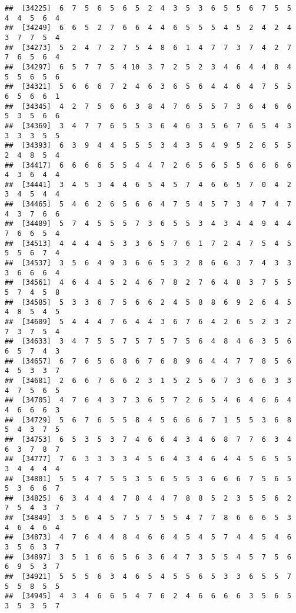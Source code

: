 \documentclass[
]{book}
\begin{document}
\begin{verbatim}
##  [34225]  6  7  5  6  5  6  5  2  4  3  5  3  6  5  5  6  7  5  5  4  4  5  6  4
##  [34249]  6  6  5  2  7  6  6  4  4  6  5  5  5  4  5  2  4  2  4  3  7  7  5  4
##  [34273]  5  2  4  7  2  7  5  4  8  6  1  4  7  7  3  7  4  2  7  7  6  5  6  4
##  [34297]  6  5  7  7  5  4 10  3  7  2  5  2  3  4  6  4  4  8  4  5  5  6  5  6
##  [34321]  5  6  6  6  7  2  4  6  3  6  5  6  4  4  6  4  7  5  5  6  5  6  6  1
##  [34345]  4  2  7  5  6  6  3  8  4  7  6  5  5  7  3  6  4  6  6  5  3  5  6  6
##  [34369]  3  4  7  7  6  5  5  3  6  4  6  3  5  6  7  6  5  4  3  3  3  3  5  5
##  [34393]  6  3  9  4  4  5  5  5  3  4  3  5  4  9  5  2  6  5  5  2  4  8  5  4
##  [34417]  6  6  6  6  5  5  4  4  7  2  6  5  6  5  5  6  6  6  6  4  3  6  4  4
##  [34441]  3  4  5  3  4  4  6  5  4  5  7  4  6  6  5  7  0  4  2  3  4  5  4  4
##  [34465]  5  4  6  2  6  5  6  6  4  7  5  4  5  7  3  4  7  4  7  4  3  7  6  6
##  [34489]  5  7  4  5  5  5  7  3  6  5  5  3  4  3  4  4  9  4  4  7  6  6  5  4
##  [34513]  4  4  4  4  5  3  3  6  5  7  6  1  7  2  4  7  5  4  5  5  5  6  7  4
##  [34537]  3  5  6  4  9  3  6  6  5  3  2  8  6  6  3  7  4  3  3  3  6  6  6  4
##  [34561]  4  6  4  4  5  2  4  6  7  8  2  7  6  4  8  3  7  5  5  5  7  4  5  8
##  [34585]  5  3  3  6  7  5  6  6  2  4  5  8  8  6  9  2  6  4  5  4  8  5  4  5
##  [34609]  5  4  4  4  7  6  4  4  3  6  7  6  4  2  6  5  2  3  2  7  3  7  5  4
##  [34633]  3  4  7  5  5  7  5  7  5  7  5  6  4  8  4  6  3  5  6  6  5  7  4  3
##  [34657]  6  7  6  5  6  8  6  7  6  8  9  6  4  4  7  7  8  5  6  4  5  3  3  7
##  [34681]  2  6  6  7  6  6  2  3  1  5  2  5  6  7  3  6  6  3  3  4  7  5  6  5
##  [34705]  4  7  6  4  3  7  3  6  5  7  2  6  5  4  6  4  6  6  4  4  6  6  6  3
##  [34729]  5  6  7  6  5  5  8  4  5  6  6  6  7  1  5  5  3  6  8  5  4  3  7  5
##  [34753]  6  5  3  5  3  7  4  6  6  4  3  4  6  8  7  7  6  3  4  6  3  7  8  7
##  [34777]  7  6  3  3  3  3  4  5  6  4  3  4  6  4  4  5  6  5  5  3  4  4  4  4
##  [34801]  5  5  4  7  5  5  3  5  6  5  5  3  6  6  6  7  5  6  5  5  3  6  6  7
##  [34825]  6  3  4  4  4  7  8  4  4  7  8  8  5  2  3  5  5  6  2  7  5  4  3  7
##  [34849]  3  5  6  4  5  7  5  7  5  5  4  7  7  8  6  6  6  5  3  4  6  4  6  4
##  [34873]  4  7  6  4  4  8  4  6  6  4  5  4  5  7  4  4  5  4  6  3  5  6  3  7
##  [34897]  3  5  1  6  6  5  6  3  6  4  7  3  5  5  4  5  7  5  6  6  9  5  3  7
##  [34921]  5  5  5  6  3  4  6  5  4  5  5  6  5  3  3  6  5  5  7  5  5  8  5  5
##  [34945]  4  3  4  6  6  5  4  7  6  2  4  6  6  6  6  3  5  6  5  3  5  3  5  7

\end{verbatim}
\end{document}
